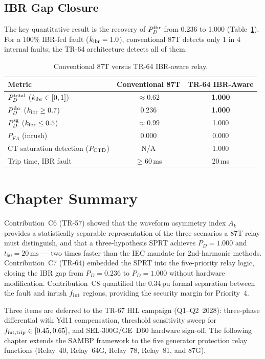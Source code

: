 \subsection{IBR Gap Closure}
\label{sec:ch5_gap}

The key quantitative result is the recovery of $P_D^{\rm ibr}$ from 0.236 to
1.000 (Table~\ref{tab:ch5_compare}).
For a 100\% IBR-fed fault ($k_{\rm ibr} = 1.0$), conventional 87T detects only
1 in 4 internal faults; the TR-64 architecture detects all of them.

\begin{table}[htbp]
  \centering
  \caption{Conventional 87T versus TR-64 IBR-aware relay.}
  \label{tab:ch5_compare}
  \begin{tabular}{lcc}
    \toprule
    Metric & Conventional 87T & TR-64 IBR-Aware \\
    \midrule
    $P_D^{\rm total}$ ($k_{\rm ibr} \in [0,1]$) & $\approx 0.62$ & \textbf{1.000} \\
    $P_D^{\rm ibr}$ ($k_{\rm ibr} \geq 0.7$)    & 0.236          & \textbf{1.000} \\
    $P_D^{\rm sg}$ ($k_{\rm ibr} \leq 0.5$)      & $\approx 0.99$ & 1.000 \\
    $P_{FA}$ (inrush)                            & 0.000          & 0.000 \\
    CT saturation detection ($P_{\rm CTD}$)      & N/A            & 1.000 \\
    Trip time, IBR fault                         & $\geq 60$\,ms  & 20\,ms \\
    \bottomrule
  \end{tabular}
\end{table}

\section{Chapter Summary}
\label{sec:ch5_summary}

Contribution~C6 (TR-57) showed that the waveform asymmetry index $A_k$
provides a statistically separable representation of the three scenarios a
87T relay must distinguish, and that a three-hypothesis SPRT achieves
$P_D = 1.000$ and $t_{50} = 20\,\text{ms}$ — two times faster than the
IEC mandate for 2nd-harmonic methods.
Contribution~C7 (TR-64) embedded the SPRT into the five-priority relay logic,
closing the IBR gap from $P_D = 0.236$ to $P_D = 1.000$ without hardware
modification.
Contribution~C8 quantified the 0.34\,pu formal separation between the fault
and inrush $f_{\rm int}$ regions, providing the security margin for Priority~4.

Three items are deferred to the TR-67 HIL campaign (Q1--Q2~2028): three-phase
differential with Yd11 compensation, threshold sensitivity sweep for
$f_{{\rm int},{\rm trip}} \in [0.45, 0.65]$, and SEL-300G/GE~D60 hardware
sign-off.
The following chapter extends the SAMBP framework to the five generator
protection relay functions (Relay~40, Relay~64G, Relay~78, Relay~81, and 87G).
